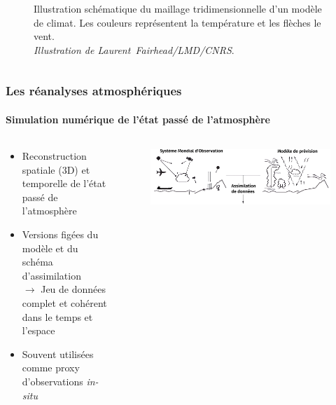 \documentclass[aspectratio=169, usepdftitle=false, xcolor={dvipsnames}, 9pt,table]{beamer}
\begin{document}
\begin{frame}[c]
\begin{columns}
{\begin{column}{0.45\textwidth}
\begin{figure}[t]
                    \captionsetup{width=0.9\textwidth}
                    \caption{\scriptsize Illustration schématique du maillage tridimensionnelle d'un modèle de climat. Les couleurs représentent la température et les flèches
                    le vent.\\\textit{Illustration de \mbox{Laurent Fairhead/LMD/CNRS}}.}
                \end{figure}
            \end{column}
        }
    \end{columns} 
\end{frame}

\begin{frame}
    \frametitle{Les réanalyses atmosphériques}
    \framesubtitle{Simulation numérique de l'état passé de l'atmosphère}
    \begin{columns}[c]
        \begin{column}{0.5\textwidth}
            \footnotesize
            \begin{block}
                \begin{itemize}
                \setlength\itemsep{3.5ex}
                    \item \alert{Reconstruction} spatiale (3D) et temporelle de l'état passé de l'atmosphère
                    \item Versions figées du modèle et du schéma d'assimilation\\
                        $\longrightarrow$ Jeu de données \alert{complet} et \alert{cohérent} dans le temps et l'espace
                    \item Souvent utilisées comme proxy d'observations \textit{in-situ}
                \end{itemize}
            \end{block}
        \end{column}
        \begin{column}{0.5\textwidth}
            \vspace{-2em}
            \begin{figure}
                \centering
                \includegraphics[width=\textwidth]{Figures/schema_reanalyse_top_custom.png}

\end{figure}
\end{column}
\end{columns}
\end{frame}
\end{document}

